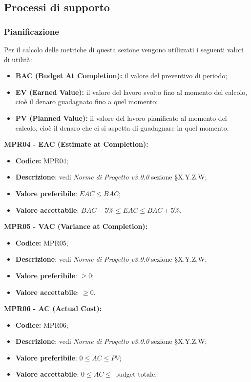 \subsection{Processi di supporto}
\subsubsection{Pianificazione}
Per il calcolo delle metriche di questa sezione vengono utilizzati i seguenti valori di utilità:
\begin{itemize}
    \item \textbf{BAC (Budget At Completion):} il valore del preventivo di periodo;
    \item \textbf{EV (Earned Value):}  il valore del lavoro svolto fino al momento del calcolo, cioè il denaro guadagnato fino a quel momento;
    \item \textbf{PV (Planned Value):} il valore del lavoro pianificato al momento del calcolo, cioè il denaro che ci si aspetta di guadagnare in quel momento.
\end{itemize}
\textbf{MPR04 - EAC (Estimate at Completion):}
\begin{itemize}
    \item \textbf{Codice:} MPR04;
    \item \textbf{Descrizione}: vedi \textit{Norme di Progetto v3.0.0} sezione \S X.Y.Z.W;
    \item \textbf{Valore preferibile}: $EAC \leq BAC$;
    \item \textbf{Valore accettabile}: $BAC -5\% \leq EAC \leq BAC +5\%.$
\end{itemize}
\textbf{MPR05 - VAC (Variance at Completion):}
\begin{itemize}
    \item \textbf{Codice:} MPR05;
    \item \textbf{Descrizione}: vedi \textit{Norme di Progetto v3.0.0} sezione \S X.Y.Z.W;
    \item \textbf{Valore preferibile}: $\geq 0$;
    \item \textbf{Valore accettabile}: $\geq 0$.
\end{itemize}
\textbf{MPR06 - AC (Actual Cost):}
\begin{itemize}
    \item \textbf{Codice:} MPR06;
    \item \textbf{Descrizione}: vedi \textit{Norme di Progetto v3.0.0} sezione \S X.Y.Z.W;
    \item \textbf{Valore preferibile}: $0 \leq AC \leq PV$;
    \item \textbf{Valore accettabile}: $0 \leq AC \leq$ budget totale.
\end{itemize}
